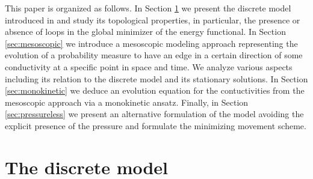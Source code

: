 \documentclass{article}
\numberwithin{equation}{section}
\begin{document}
This paper is organized as follows. In Section \ref{sec:discrete} we present the discrete model introduced in \cite{hu2013adaptation} and study its topological properties,
in particular, the presence or absence of loops in the global minimizer of the energy functional.
In Section \ref{sec:mesoscopic} we introduce a mesoscopic modeling approach representing the evolution of a probability measure
to have an edge in a certain direction of some conductivity at a specific point in space and time.
We analyze various aspects including its relation to the discrete model and its stationary solutions.
In Section \ref{sec:monokinetic} we deduce an evolution equation for the contuctivities from the mesoscopic approach via a monokinetic ansatz.
Finally, in Section \ref{sec:pressureless} we present an alternative formulation of the model %
avoiding the explicit presence of the pressure and formulate the minimizing movement scheme.


\section{The discrete model}\label{sec:discrete}
\end{document}
